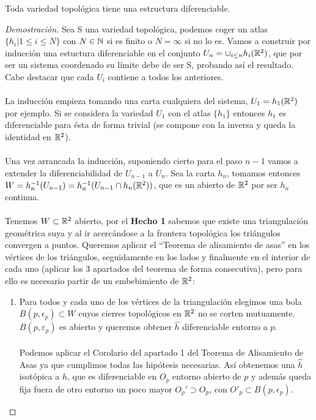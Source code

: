 	\begin{teora}
		Toda variedad topológica tiene una estructura diferenciable.
	\end{teora}
	\begin{proof}[Demostración]
		Sea S una variedad topológica, podemos coger un atlas $\{h_i | 1\leq i\leq N\}$ con $N \in \mathbb{N}$ si es finito o $N = \infty$ si no lo es. Vamos a construir por inducción una estuctura diferenciable en el conjunto $U_n = \cup_{i\leq n}h_i(\mathbb{R}^2)$, que por ser un sistema coordenado su límite debe de ser S, probando así el resultado. Cabe destacar que cada $U_i$ contiene a todos los anteriores. \\
		\\ La inducción empieza tomando una carta cualquiera del sistema, $U_1=h_1(\mathbb{R}^2)$ por ejemplo. Si se considera la variedad $U_1$ con el atlas $\{h_1\}$ entonces $h_1$ es diferenciable para ésta de forma trivial (se compone con la inversa y queda la identidad en $\mathbb{R}^2$).\\
		\\ Una vez arrancada la inducción, suponiendo cierto para el paso $n-1$ vamos a extender la diferenciabilidad de $U_{n-1}$ a $U_n$. Sea la carta $h_n$, tomamos entonces $W=h_n^{-1}(U_{n-1})=h_n^{-1}(U_{n-1}\cap h_n(\mathbb{R}^2))$, que es un abierto de $\mathbb{R}^2$ por ser $h_n$ continua. \\
		\\ Tenemos $W\subset \mathbb{R}^2$ abierto, por el \textbf{Hecho 1} sabemos que existe una triangulación geométrica suya y al ir acercándose a la frontera topológica los triángulos convergen a puntos. Queremos aplicar el ``Teorema de alisamiento de asas'' en los vértices de los triángulos, seguidamente en los lados y finalmente en el interior de cada uno (aplicar los 3 apartados del teorema de forma consecutiva), pero para ello es necesario partir de un embebimiento de $\mathbb{R}^2$:
		\begin{enumerate}
			\item Para todos y cada uno de los vértices de la triangulación elegimos una bola $B(p, \epsilon_p) \subset W$ cuyos cierres topológicos en $\mathbb{R}^2$ no se corten mutuamente. $B(p,\varepsilon _p)$ es abierto y queremos obtener $\widehat{h}$ diferenciable entorno a $p$. \\
			\\ Podemos aplicar el Corolario del apartado 1 del Teorema de Alisamiento de Asas ya que cumplimos todas las hipótesis necesarias. Así obtenemos una $\widehat{h}$ isotópica a $h$, que es diferenciable en $O_p$ entorno abierto de $p$ y además queda fija fuera de otro entorno un poco mayor $O_p'\supset O_p$, con $O'_p\subset B(p, \epsilon_p) $.\\

\end{enumerate}
\end{proof}
